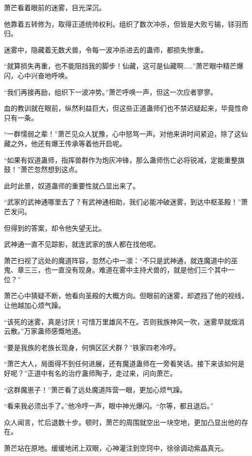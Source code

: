
\begin{this_body}

萧芒看着眼前的迷雾，目光深沉。

他靠着五转修为，取得正道统帅权利。组织了数次冲杀，但皆是大败亏输，铩羽而归。

迷雾中，隐藏着无数犬兽，令每一波冲杀进去的蛊师，都损失惨重。

“就算损失再重，也不能阻挡我的脚步！仙藏，这可是仙藏啊……”萧芒眼中精芒爆闪，心中兴奋地呼唤。

“我们再接再励，组织下一波冲势。”萧芒呼唤一声，但这一次应者寥寥。

血的教训就在眼前，纵然利益巨大，但这些正道蛊师们也不禁迟疑起来，毕竟性命只有一条。

“一群懦弱之辈！”萧芒见众人犹豫，心中怒骂一声。对他来讲时间紧迫，除了这仙藏之外，他还有爆王传承等着他开启呢。

“如果有奴道蛊师，指挥兽群作为炮灰冲锋，那么蛊师伤亡必将锐减，定能重整旗鼓！”萧芒忽然想到这点。

此时此景，奴道蛊师的重要性就凸显出来了。

“武家的武神通哪里去了？有武神通相助，我们必能冲破迷雾，到达中枢圣殿！”萧芒发问。

但得到的答案，却令他失望无比。

武神通一直不见踪影，就连武家的族人都在找他呢。

萧芒扫视了远处的魔道阵容，忽然心中一凛：“不只是武神通，就连魔道中的巫鬼、章三三，也一直没有现身。难道在雾中主持犬兽的，就是他们三个其中一位？”

萧芒心中猜疑不断，他看向圣殿的大概方向。但眼前的迷雾，却遮挡了他的视线，让他越加心烦气躁。

“该死的迷雾，真是讨厌！可惜万里雄风不在。否则我族神风一吹，迷雾早就烟消云散。”万家蛊师感慨地道。

“要是我族的老族长现身，何惧区区犬群？”铁家四老冷哼。

“萧芒大人，局面得不到任何进展，还有魔道蛊师在一旁看笑话。接下来该如何是好呢？”正道中有名的治疗蛊师陶子，走过来，问向萧芒。

“这群魔崽子！”萧芒看了远处魔道阵营一眼，更加心烦气躁。

“看来我必须出手了。”他冷哼一声，眼中神光爆闪。“尔等，都且退后。”

众人闻言，忙后退数十步。顿时，萧芒的周围就空出一块空地，更加凸显出他的存在。

萧芒站在原地。缓缓地闭上双眼，心神灌注到空窍中，徐徐调动紫晶真元。


\end{this_body}
